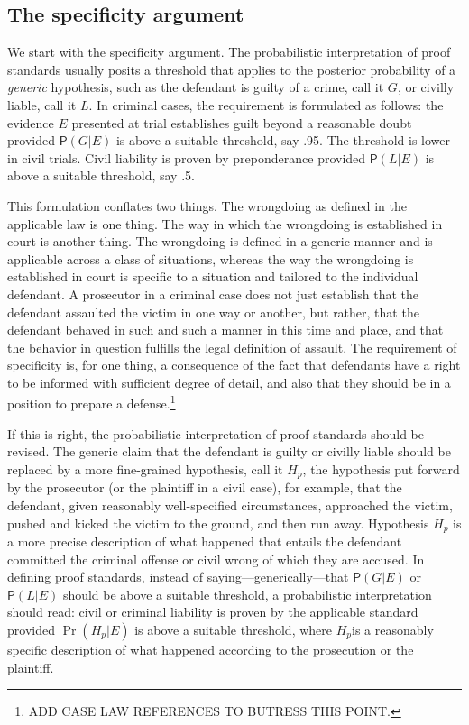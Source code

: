 \documentclass[
  10pt,
  dvipsnames,enabledeprecatedfontcommands]{scrartcl}
\newcommand{\pr}[1]{\ensuremath{\mathsf{P}(#1)}}
\begin{document}
\hypertarget{the-specificity-argument}{%
\subsection{The specificity argument}\label{the-specificity-argument}}

We start with the specificity argument. The probabilistic interpretation
of proof standards usually posits a threshold that applies to the
posterior probability of a \emph{generic} hypothesis, such as the
defendant is guilty of a crime, call it \(G\), or civilly liable, call
it \(L\). In criminal cases, the requirement is formulated as follows:
the evidence \(E\) presented at trial establishes guilt beyond a
reasonable doubt provided \(\pr{G \vert E}\) is above a suitable
threshold, say .95. The threshold is lower in civil trials. Civil
liability is proven by preponderance provided \(\pr{L \vert E}\) is
above a suitable threshold, say .5.

This formulation conflates two things. The wrongdoing as defined in the
applicable law is one thing. The way in which the wrongdoing is
established in court is another thing. The wrongdoing is defined in a
generic manner and is applicable across a class of situations, whereas
the way the wrongdoing is established in court is specific to a
situation and tailored to the individual defendant. A prosecutor in a
criminal case does not just establish that the defendant assaulted the
victim in one way or another, but rather, that the defendant behaved in
such and such a manner in this time and place, and that the behavior in
question fulfills the legal definition of assault. The requirement of
specificity is, for one thing, a consequence of the fact that defendants
have a right to be informed with sufficient degree of detail, and also
that they should be in a position to prepare a defense.\footnote{ADD
  CASE LAW REFERENCES TO BUTRESS THIS POINT.}

If this is right, the probabilistic interpretation of proof standards
should be revised. The generic claim that the defendant is guilty or
civilly liable should be replaced by a more fine-grained hypothesis,
call it \(H_p\), the hypothesis put forward by the prosecutor (or the
plaintiff in a civil case), for example, that the defendant, given
reasonably well-specified circumstances, approached the victim, pushed
and kicked the victim to the ground, and then run away. Hypothesis
\(H_p\) is a more precise description of what happened that entails the
defendant committed the criminal offense or civil wrong of which they
are accused. In defining proof standards, instead of
saying---generically---that \(\pr{G \vert E}\) or \(\pr{L \vert E}\)
should be above a suitable threshold, a probabilistic interpretation
should read: civil or criminal liability is proven by the applicable
standard provided \(\Pr(H_p \vert E)\) is above a suitable threshold,
where \(H_p\)is a reasonably specific description of what happened
according to the prosecution or the plaintiff.
\end{document}
